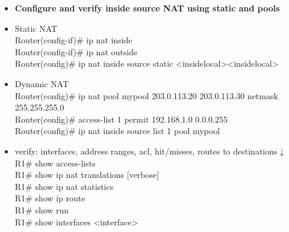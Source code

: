\documentclass{article}
\begin{document}
\begin{itemize}
  \item \textbf{Configure and verify inside source NAT using static and pools}
  	\item[] Static NAT\\
		Router(config-if)\# ip nat inside\\
		Router(config-if)\# ip nat outside\\
		Router(config)\# ip nat inside source static \textless inside\-local\textgreater \textless inside\-local\textgreater
	\item[] Dynamic NAT\\
		Router(config)\# ip nat pool mypool 203.0.113.20 203.0.113.30 netmask 255.255.255.0\\
		Router(config)\# access-list 1 permit 192.168.1.0 0.0.0.255\\
		Router(config)\# ip nat inside source list 1 pool mypool\\
	\item[] verify: interfaces, address ranges, acl, hit/misses, routes to destinations$\downarrow$\\
		R1\# show access-lists\\
		R1\# show ip nat translations [verbose]\\
		R1\# show ip nat statistics\\
		R1\# show ip route\\
		R1\# show run\\
		R1\# show interfaces \textless interface\textgreater
		

\end{itemize}
\end{document}
